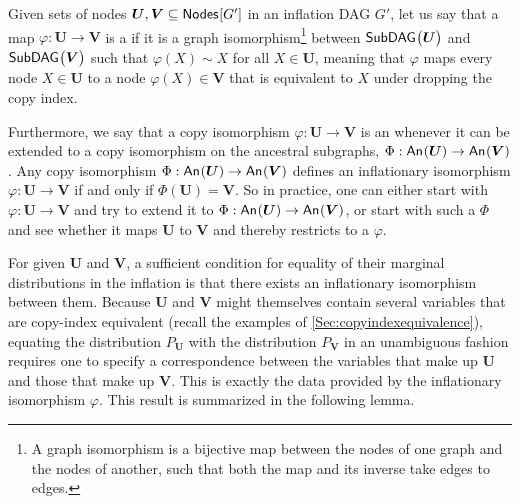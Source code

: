 {Given sets of nodes $\bm{U},\bm{V}\subseteq{\operatorname{\mathsf{Nodes}}_{}}\lbrack G'\rbrack$ in an inflation DAG $G'$, let us say that a map $\varphi:\bm{U}\to\bm{V}$ is a  if it is a graph isomorphism\footnote{A graph isomorphism is a bijective map between the nodes of one graph and the nodes of another, such that both the map and its inverse take edges to edges.} between ${\operatorname{\mathsf{SubDAG}}_{}}\bigl\lparen\bm{U}\bigr\rparen$ and ${\operatorname{\mathsf{SubDAG}}_{}}\bigl\lparen\bm{V}\bigr\rparen$ such that $\varphi(X)\sim X$ for all $X\in\bm{U}$, meaning that $\varphi$ maps every node $X\in\bm{U}$ to a node $\varphi(X)\in\bm{V}$ that is equivalent to $X$ under dropping the copy index. %

Furthermore, we say that a copy isomorphism $\varphi : \bm{U}\to\bm{V}$ is an  whenever it can be extended to a copy isomorphism on the ancestral subgraphs, $\Phi : {\mathsf{An}_{}}\lparen\bm{U}\rparen\to{\mathsf{An}_{}}\lparen\bm{V}\rparen$. %
Any copy isomorphism $\Phi: {\mathsf{An}_{}}\lparen\bm{U}\rparen\to{\mathsf{An}_{}}\lparen\bm{V}\rparen$ defines an inflationary isomorphism $\varphi:\bm{U}\to\bm{V}$ if and only if $\Phi(\bm{U}) = \bm{V}$.
So in practice, one can either start with $\varphi : \bm{U}\to\bm{V}$ and try to extend it to $\Phi : {\mathsf{An}_{}}\lparen\bm{U}\rparen\to{\mathsf{An}_{}}\lparen\bm{V}\rparen$, or start with such a $\Phi$ and see whether it maps $\bm{U}$ to $\bm{V}$ and thereby restricts to a $\varphi$.

For given $\bm{U}$ and $\bm{V}$, a sufficient condition for equality of their marginal distributions in the inflation is that there exists an inflationary isomorphism between them.  Because $\bm{U}$ and $\bm{V}$ might themselves contain several variables that are copy-index equivalent (recall the examples of \cref{Sec:copyindexequivalence}), equating the distribution $P_{\bm{U}}$ with the distribution $P_{\bm{V}}$ in an unambiguous fashion requires one to specify a correspondence between the variables that make up $\bm{U}$ and those that make up $\bm{V}$. This is exactly the data provided by the inflationary isomorphism $\varphi$.  This result is summarized in the following lemma.


}
